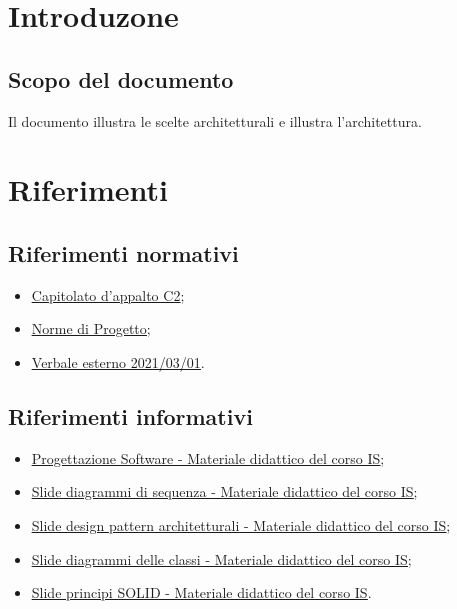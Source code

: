 \documentclass[a4paper, 12pt]{article}
\begin{document}
\makefrontpage

\makeversioni

\tableofcontents
\clearpage

\section{Introduzone}
\subsection{Scopo del documento}
Il documento illustra le scelte architetturali e illustra l'architettura.

\section{Riferimenti}
\subsection{Riferimenti normativi}
\begin{itemize}
    \item \underline{\href{https://www.math.unipd.it/~tullio/IS-1/2021/Progetto/C2.pdf}{Capitolato d'appalto C2}};
    \item \underline{\href{https://github.com/iota97/WinningSoftwareSolution/blob/main/public/interni/norme_di_progetto_v2.0.0.pdf}{Norme di Progetto}};
    \item \underline{\href{https://github.com/iota97/WinningSoftwareSolution/blob/main/public/esterni/verbali/2021_01_03_E.pdf}{Verbale esterno 2021/03/01}}.
\end{itemize}
\subsection{Riferimenti informativi}
\begin{itemize}
    \item \underline{\href{https://www.math.unipd.it/~tullio/IS-1/2021/Dispense/T09.pdf}{Progettazione Software - Materiale didattico del corso IS}};
    \item \underline{\href{https://www.math.unipd.it/~rcardin/swea/2022/Diagrammi\%20di\%20Sequenza.pdf}{Slide diagrammi di sequenza - Materiale didattico del corso IS}};
    \item \underline{\href{https://www.math.unipd.it/~rcardin/swea/2022/Software\%20Architecture\%20Patterns.pdf}{Slide design pattern architetturali - Materiale didattico del corso IS}};
    \item \underline{\href{https://www.math.unipd.it/~rcardin/swea/2021/Diagrammi\%20delle\%20Classi_4x4.pdf}{Slide diagrammi delle classi - Materiale didattico del corso IS}};
    \item \underline{\href{https://www.math.unipd.it/~rcardin/sweb/2022/L03.pdf}{Slide principi SOLID - Materiale didattico del corso IS}}.
\end{itemize}
\end{document}
